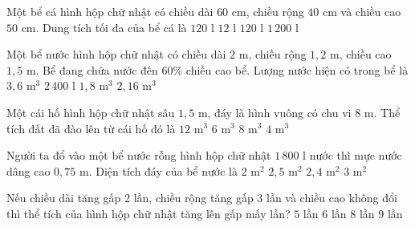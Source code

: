 \begin{ex} %
Một bể cá hình hộp chữ nhật có chiều dài $60\text{ cm}$, chiều rộng $40\text{ cm}$ và chiều cao $50\text{ cm}$. Dung tích tối đa của bể cá là
\choice
{$120\text{ l}$}
{$12\text{ l}$}
{\True $120\text{ l}$}
{$1\,200\text{ l}$}
\end{ex}

\begin{ex} %
Một bể nước hình hộp chữ nhật có chiều dài $2\text{ m}$, chiều rộng $1{,}2\text{ m}$, chiều cao $1{,}5\text{ m}$. Bể đang chứa nước đến $60\%$ chiều cao bể. Lượng nước hiện có trong bể là
\choice
{$3{,}6\text{ m}^3$}
{$2\,400\text{ l}$}
{$1{,}8\text{ m}^3$}
{\True $2{,}16\text{ m}^3$}
\end{ex}

\begin{ex} %
Một cái hố hình hộp chữ nhật sâu $1{,}5\text{ m}$, đáy là hình vuông có chu vi $8\text{ m}$. Thể tích đất đã đào lên từ cái hố đó là
\choice
{$12\text{ m}^3$}
{\True $6\text{ m}^3$}
{$8\text{ m}^3$}
{$4\text{ m}^3$}
\end{ex}

\begin{ex} %
Người ta đổ vào một bể nước rỗng hình hộp chữ nhật $1\,800\text{ l}$ nước thì mực nước dâng cao $0{,}75\text{ m}$. Diện tích đáy của bể nước là
\choice
{$2\text{ m}^2$}
{$2{,}5\text{ m}^2$}
{\True $2{,}4\text{ m}^2$}
{$3\text{ m}^2$}
\end{ex}

\begin{ex} %
Nếu chiều dài tăng gấp $2$ lần, chiều rộng tăng gấp $3$ lần và chiều cao không đổi thì thể tích của hình hộp chữ nhật tăng lên gấp mấy lần?
\choice
{$5$ lần}
{\True $6$ lần}
{$8$ lần}
{$9$ lần}
\end{ex}

